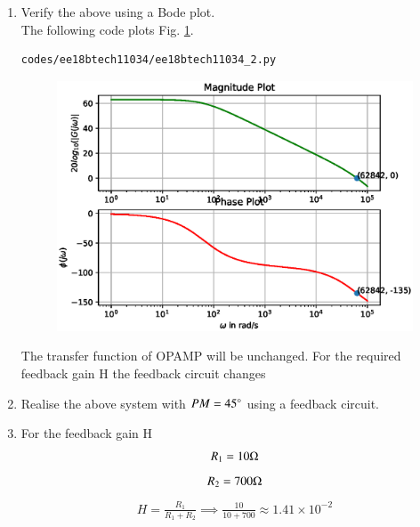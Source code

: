 \begin{enumerate}[label=\arabic*.,ref=\theenumi]
\item Verify the above using a Bode plot. 
\\
\solution 
The following code plots  Fig. \ref{fig:ee18btech11034_2}.
%
\begin{lstlisting}
codes/ee18btech11034/ee18btech11034_2.py
\end{lstlisting}
%
\begin{figure}[!h]
\centering
\includegraphics[width=\columnwidth]{./figs/ee18btech11034/ee18btech11034_2.eps}
\caption{}
\label{fig:ee18btech11034_2}
\end{figure}
The transfer function of OPAMP will be unchanged.
For the required feedback gain H the feedback circuit changes

\item Realise the above system with $PM = 45 \degree$ using a feedback circuit.\\
\solution
\begin{figure}[ht!]
	\begin{center}
		\resizebox{\columnwidth}{!}{}
	\end{center}
	\caption{}
	\label{fig:ee18btech11034_figd}
\end{figure}

\item For the feedback gain H\\
\solution
\begin{align}
    R_{1} = 10\ohm
\end{align}
\begin{align}
    R_{2} = 700\ohm
\end{align}
\begin{align}
    H = \frac{R_{1}}{R_{1}+R_{2}} 
    \implies \frac{10}{10+700} \approx 1.41 \times 10^{-2}
\end{align}


\end{enumerate}
